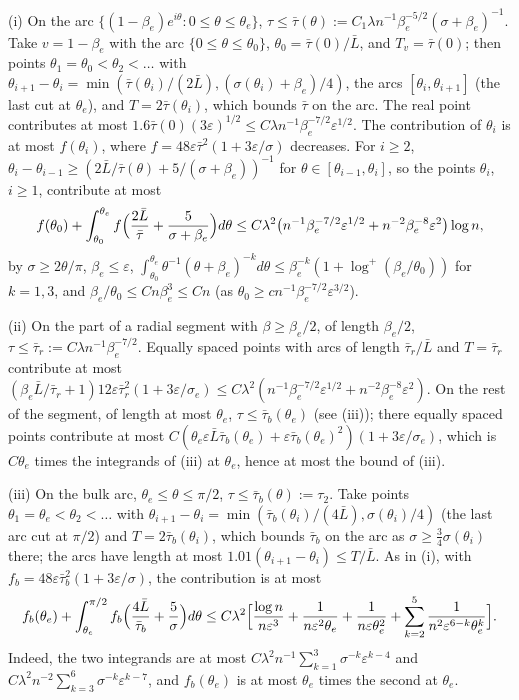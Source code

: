 \documentclass[11pt]{amsart}
\theoremstyle{definition}
\theoremstyle{remark}
\numberwithin{equation}{section}
\newcommand{\eps}{\varepsilon}
\begin{document}
(i) On the arc $\{(1-\beta_e)e^{i\theta}:0\le\theta\le\theta_e\}$, $\tau\le\bar\tau(\theta):=C_1\lambda n^{-1}\beta_e^{-5/2}(\sigma+\beta_e)^{-1}$. Take $v=1-\beta_e$ with the arc $\{0\le\theta\le\theta_0\}$, $\theta_0=\bar\tau(0)/\bar L$, and $T_v=\bar\tau(0)$; then points $\theta_1=\theta_0<\theta_2<\dots$ with $\theta_{i+1}-\theta_i=\min(\bar\tau(\theta_i)/(2\bar L),(\sigma(\theta_i)+\beta_e)/4)$, the arcs $[\theta_i,\theta_{i+1}]$ (the last cut at $\theta_e$), and $T=2\bar\tau(\theta_i)$, which bounds $\bar\tau$ on the arc. The real point contributes at most $1.6\bar\tau(0)(3\eps)^{1/2}\le C\lambda n^{-1}\beta_e^{-7/2}\eps^{1/2}$. The contribution of $\theta_i$ is at most $f(\theta_i)$, where $f=48\eps\bar\tau^2(1+3\eps/\sigma)$ decreases. For $i\ge2$, $\theta_i-\theta_{i-1}\ge(2\bar L/\bar\tau(\theta)+5/(\sigma+\beta_e))^{-1}$ for $\theta\in[\theta_{i-1},\theta_i]$, so the points $\theta_i$, $i\ge1$, contribute at most
\[
f(\theta_0)+\int_{\theta_0}^{\theta_e}f\Bigl(\frac{2\bar L}{\bar\tau}+\frac5{\sigma+\beta_e}\Bigr)d\theta\le C\lambda^2\bigl(n^{-1}\beta_e^{-7/2}\eps^{1/2}+n^{-2}\beta_e^{-8}\eps^2\bigr)\log n,
\]
by $\sigma\ge2\theta/\pi$, $\beta_e\le\eps$, $\int_{\theta_0}^{\theta_e}\theta^{-1}(\theta+\beta_e)^{-k}d\theta\le\beta_e^{-k}(1+\log^+(\beta_e/\theta_0))$ for $k=1,3$, and $\beta_e/\theta_0\le Cn\beta_e^3\le Cn$ (as $\theta_0\ge cn^{-1}\beta_e^{-7/2}\eps^{3/2}$).

(ii) On the part of a radial segment with $\beta\ge\beta_e/2$, of length $\beta_e/2$, $\tau\le\bar\tau_r:=C\lambda n^{-1}\beta_e^{-7/2}$. Equally spaced points with arcs of length $\bar\tau_r/\bar L$ and $T=\bar\tau_r$ contribute at most $(\beta_e\bar L/\bar\tau_r+1)12\eps\bar\tau_r^2(1+3\eps/\sigma_e)\le C\lambda^2(n^{-1}\beta_e^{-7/2}\eps^{1/2}+n^{-2}\beta_e^{-8}\eps^2)$. On the rest of the segment, of length at most $\theta_e$, $\tau\le\bar\tau_b(\theta_e)$ (see (iii)); there equally spaced points contribute at most $C(\theta_e\eps\bar L\bar\tau_b(\theta_e)+\eps\bar\tau_b(\theta_e)^2)(1+3\eps/\sigma_e)$, which is $C\theta_e$ times the integrands of (iii) at $\theta_e$, hence at most the bound of (iii).

(iii) On the bulk arc, $\theta_e\le\theta\le\pi/2$, $\tau\le\bar\tau_b(\theta):=\tau_2$. Take points $\theta_1=\theta_e<\theta_2<\dots$ with $\theta_{i+1}-\theta_i=\min(\bar\tau_b(\theta_i)/(4\bar L),\sigma(\theta_i)/4)$ (the last arc cut at $\pi/2$) and $T=2\bar\tau_b(\theta_i)$, which bounds $\bar\tau_b$ on the arc as $\sigma\ge\frac34\sigma(\theta_i)$ there; the arcs have length at most $1.01(\theta_{i+1}-\theta_i)\le T/\bar L$. As in (i), with $f_b=48\eps\bar\tau_b^2(1+3\eps/\sigma)$, the contribution is at most
\[
f_b(\theta_e)+\int_{\theta_e}^{\pi/2}f_b\Bigl(\frac{4\bar L}{\bar\tau_b}+\frac5\sigma\Bigr)d\theta
\le C\lambda^2\Bigl[\frac{\log n}{n\eps^3}+\frac1{n\eps^2\theta_e}+\frac1{n\eps\theta_e^2}+\sum_{k=2}^{5}\frac1{n^2\eps^{6-k}\theta_e^{k}}\Bigr].
\]
Indeed, the two integrands are at most $C\lambda^2n^{-1}\sum_{k=1}^3\sigma^{-k}\eps^{k-4}$ and $C\lambda^2n^{-2}\sum_{k=3}^6\sigma^{-k}\eps^{k-7}$, and $f_b(\theta_e)$ is at most $\theta_e$ times the second at $\theta_e$.
\end{document}
